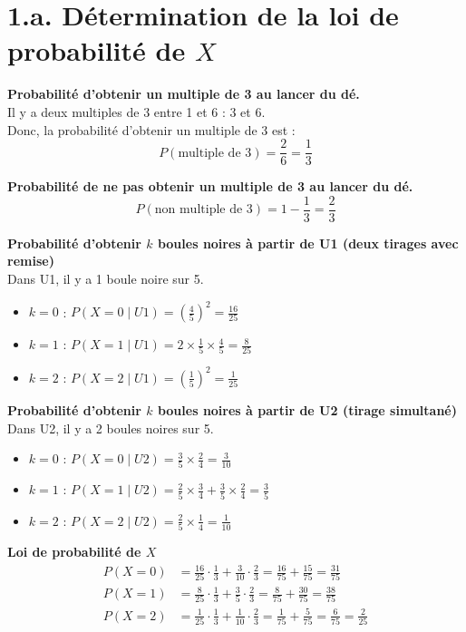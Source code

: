 \documentclass[12pt]{article}
\begin{document}
\section*{1.a. Détermination de la loi de probabilité de $X$}

\textbf{Probabilité d'obtenir un multiple de 3 au lancer du dé.}\\
Il y a deux multiples de 3 entre 1 et 6 : 3 et 6.\\
Donc, la probabilité d'obtenir un multiple de 3 est :
\[
P(\text{multiple de 3}) = \frac{2}{6} = \frac{1}{3}
\]

\textbf{Probabilité de ne pas obtenir un multiple de 3 au lancer du dé.}\\
\[
P(\text{non multiple de 3}) = 1 - \frac{1}{3} = \frac{2}{3}
\]

\textbf{Probabilité d'obtenir \(k\) boules noires à partir de U1 (deux tirages avec remise)}\\
Dans U1, il y a 1 boule noire sur 5.\\

\begin{itemize}
    \item \(k = 0\) : \(P(X = 0 \mid U1) = \left( \frac{4}{5} \right)^2 = \frac{16}{25}\)
    \item \(k = 1\) : \(P(X = 1 \mid U1) = 2 \times \frac{1}{5} \times \frac{4}{5} = \frac{8}{25}\)
    \item \(k = 2\) : \(P(X = 2 \mid U1) = \left( \frac{1}{5} \right)^2 = \frac{1}{25}\)
\end{itemize}

\textbf{Probabilité d'obtenir \(k\) boules noires à partir de U2 (tirage simultané)}\\
Dans U2, il y a 2 boules noires sur 5.

\begin{itemize}
    \item \(k = 0\) : \(P(X = 0 \mid U2) = \frac{3}{5} \times \frac{2}{4} = \frac{3}{10}\)
    \item \(k = 1\) : \(P(X = 1 \mid U2) = \frac{2}{5} \times \frac{3}{4} + \frac{3}{5} \times \frac{2}{4} = \frac{3}{5}\)
    \item \(k = 2\) : \(P(X = 2 \mid U2) = \frac{2}{5} \times \frac{1}{4} = \frac{1}{10}\)
\end{itemize}

\textbf{Loi de probabilité de $X$}
\[
\begin{aligned}
P(X = 0) &= \frac{16}{25} \cdot \frac{1}{3} + \frac{3}{10} \cdot \frac{2}{3} = \frac{16}{75} + \frac{15}{75} = \frac{31}{75} \\
P(X = 1) &= \frac{8}{25} \cdot \frac{1}{3} + \frac{3}{5} \cdot \frac{2}{3} = \frac{8}{75} + \frac{30}{75} = \frac{38}{75} \\
P(X = 2) &= \frac{1}{25} \cdot \frac{1}{3} + \frac{1}{10} \cdot \frac{2}{3} = \frac{1}{75} + \frac{5}{75} = \frac{6}{75} = \frac{2}{25}
\end{aligned}
\]
\end{document}

